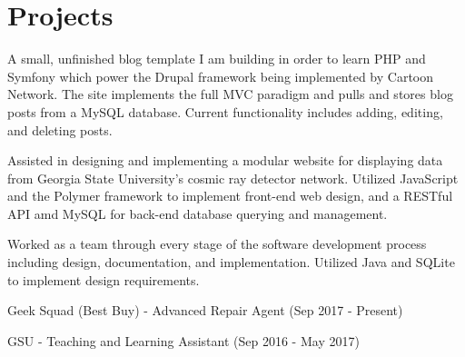 \documentclass[]{deedy-resume-openfont}
\begin{document}
\begin{minipage}[t]{0.66\textwidth}

\section{Projects}
A small, unfinished blog template I am building in order to learn PHP and Symfony which power the Drupal framework being implemented by Cartoon Network. The site implements the full MVC paradigm and pulls and stores blog posts from a MySQL database. Current functionality includes adding, editing, and deleting posts.
\sectionsep

Assisted in designing and implementing a modular website for displaying data from Georgia State University's cosmic ray detector network. Utilized JavaScript and the Polymer framework to implement front-end web design, and a RESTful API amd MySQL for back-end database querying and management.
\sectionsep

Worked as a team through every stage of the software development process including design, documentation, and implementation. Utilized Java and SQLite to implement design requirements.
\sectionsep


\begin{tightemize}
\item Geek Squad (Best Buy) - Advanced Repair Agent (Sep 2017 - Present)
\item GSU - Teaching and Learning Assistant (Sep 2016 - May 2017)
\end{tightemize}
\sectionsep

\end{minipage} 
\end{document}

